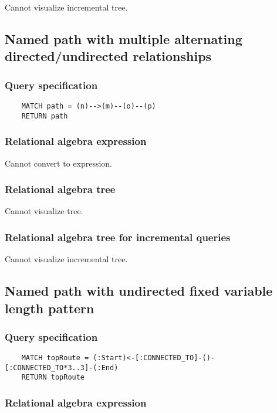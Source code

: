 	Cannot visualize incremental tree.
	\subsection{Named path with multiple alternating directed/undirected relationships}

	\subsubsection*{Query specification}

	\begin{lstlisting}
	MATCH path = (n)-->(m)--(o)--(p)
	RETURN path
	\end{lstlisting}


	\subsubsection*{Relational algebra expression}

	Cannot convert to expression.

	\subsubsection*{Relational algebra tree}

	Cannot visualize tree.

	\subsubsection*{Relational algebra tree for incremental queries}

	Cannot visualize incremental tree.
	\subsection{Named path with undirected fixed variable length pattern}

	\subsubsection*{Query specification}

	\begin{lstlisting}
	MATCH topRoute = (:Start)<-[:CONNECTED_TO]-()-[:CONNECTED_TO*3..3]-(:End)
	RETURN topRoute
	\end{lstlisting}


	\subsubsection*{Relational algebra expression}

